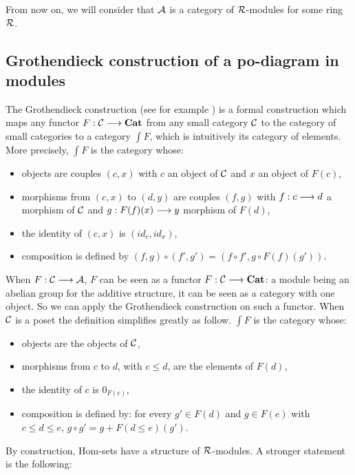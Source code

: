 	From now on, we will consider that $\mathcal{A}$ is a category of $\mathcal{R}$-modules for some ring $\mathcal{R}$.
	
	\subsection{Grothendieck construction of a po-diagram in modules}
	
	The Grothendieck construction (see for example \cite{johnstone02}) is a formal construction which maps any functor $F : \mathcal{C} \longrightarrow \textbf{Cat}$ from any small category $\mathcal{C}$ to the category of small categories to a category $\int F$, which is intuitively its category of elements. More precisely, $\int F$ is the category whose:
	\begin{itemize}
		\item objects are couples $(c,x)$ with $c$ an object of $\mathcal{C}$ and $x$ an object of $F(c)$,
		\item morphisms from $(c,x)$ to $(d,y)$ are couples $(f,g)$ with $f : c \longrightarrow d$ a morphism of $\mathcal{C}$ and $g : F(f)(x) \longrightarrow y$ morphism of $F(d)$,
		\item the identity of $(c,x)$ is $(id_c, id_x)$,
		\item composition is defined by $(f,g)\circ(f',g') = (f\circ f',g\circ F(f)(g'))$.
	\end{itemize}
	

When $F : \mathcal{C} \longrightarrow \mathcal{A}$, $F$ can be seen as a functor $F : \mathcal{C} \longrightarrow \textbf{Cat}$: a module being an abelian group for the additive structure, it can be seen as a category with one object. So we can apply the Grothendieck construction on such a functor. When $\mathcal{C}$ is a poset the definition simplifies greatly as follow. $\int F$ is the category whose:
	\begin{itemize}
		\item objects are the objects of $\mathcal{C}$,
		\item morphisms from $c$ to $d$, with $c \leq d$, are the elements of $F(d)$,
		\item the identity of $c$ is $0_{F(c)}$,
		\item composition is defined by: for every $g' \in F(d)$ and $g \in F(e)$ with $c \leq d \leq e$, $g\circ g' = g + F(d\leq e)(g')$.
	\end{itemize}
By construction, Hom-sets have a structure of $\mathcal{R}$-modules. A stronger statement is the following:

